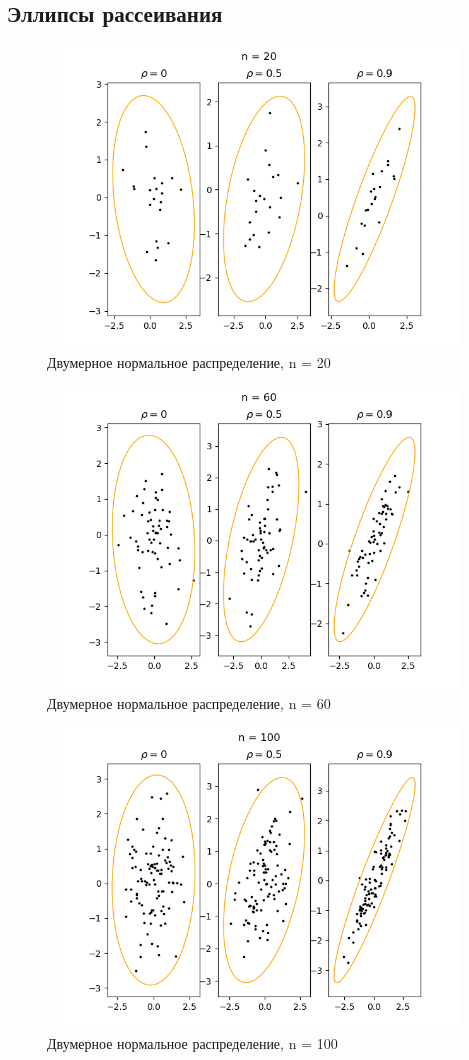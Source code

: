 \documentclass[../body.tex]{subfiles}
\begin{document}
	\subsection{Эллипсы рассеивания}
	
	\begin{figure}[H]
		\centering
		\includegraphics[width = 12cm, height = 8cm]{img/Ellipse n = 20.png}
		\caption{ Двумерное нормальное распределение, n = 20}
		\label{fig:f20}
	\end{figure}
	
	\begin{figure}[H]
		\centering
		\includegraphics[width = 12cm, height = 8cm]{img/Ellipse n = 60.png}
		\caption{Двумерное нормальное распределение, n = 60}
		\label{fig:f60}
	\end{figure}
	
	\begin{figure}[H]
		\centering
		\includegraphics[width = 12cm, height = 8cm]{img/Ellipse n = 100.png}
		\caption{Двумерное нормальное распределение, n = 100}
		\label{fig:f100}
	\end{figure}
	
\end{document}
